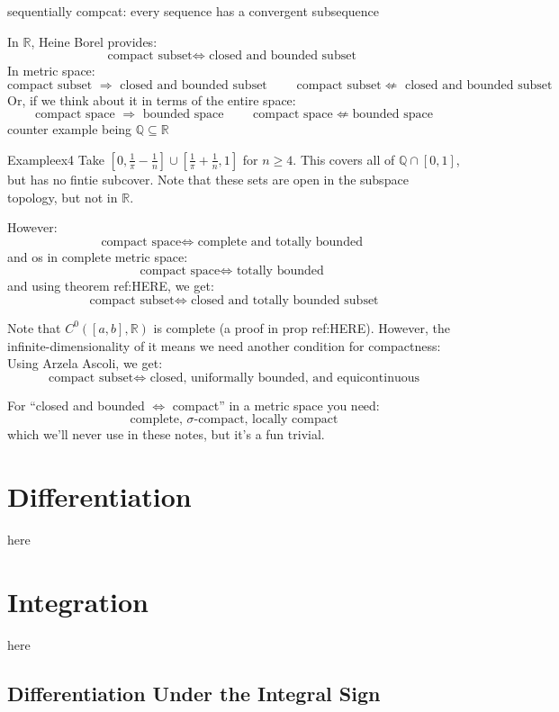 \documentclass{book}
\newcommand{\Q}{{\mathbb{Q}}}
\newcommand{\R}{{\mathbb{R}}}
\newcommand{\sse}{\subseteq}
\newcommand{\Rw}{\Rightarrow}
\newcommand{\Lw}{\Leftarrow}
\newcommand{\LRw}{\Leftrightarrow}
\begin{document}
sequentially compcat: every sequence has a convergent subsequence


In $\R$, Heine Borel provides:
\[
	\text{compact subset} \LRw \text{ closed and bounded subset }
\]
In metric space:
\[
	\text{compact subset } \Rw \text{ closed and bounded subset } \qquad \text{compact subset} \not\Lw \text{ closed and bounded subset}
\]
Or, if we think about it in terms of the entire space:
\[
	\text{compact space } \Rw \text{ bounded space } \qquad \text{compact space} \not\Lw \text{bounded space}
\]
counter example being $\Q \sse \R$
\begin{example}{Example}{ex4}
	Take $[0, \frac{1}{\pi} - \frac{1}{n}] \cup [ \frac{1}{\pi} + \frac{1}{n}, 1]$ for $n \ge 4$. This covers all of $\Q
	\cap [0,1]$, but has no fintie subcover. Note that these sets are open in the subspace topology, but not in $\R$.
\end{example}
However:
\[
	\text{compact space} \LRw \text{ complete and totally bounded }
\]
and os in complete metric space:
\[
	\text{compact space} \LRw \text{ totally bounded }
\]
and using theorem ref:HERE, we get:
\[
	\text{compact subset} \LRw \text{ closed and totally bounded subset}
\]


Note that $C^0([a,b], \R)$ is complete (a proof in prop ref:HERE). However, the infinite-dimensionality of it means we
need another condition for compactness: Using Arzela Ascoli, we get:
\[
	\text{compact subset} \LRw \text{ closed, uniformally bounded, and equicontinuous}
\]

For ``closed and bounded $\LRw$ compact'' in a metric space you need:
\[
	\text{complete, $\sigma$-compact, locally compact}
\]
which we'll never use in these notes, but it's a fun trivial.

\chapter{Differentiation}\label{cha:differentiation}

here

\chapter{Integration}\label{cha:integration}
here

\section{Differentiation Under the Integral Sign}
\end{document}
